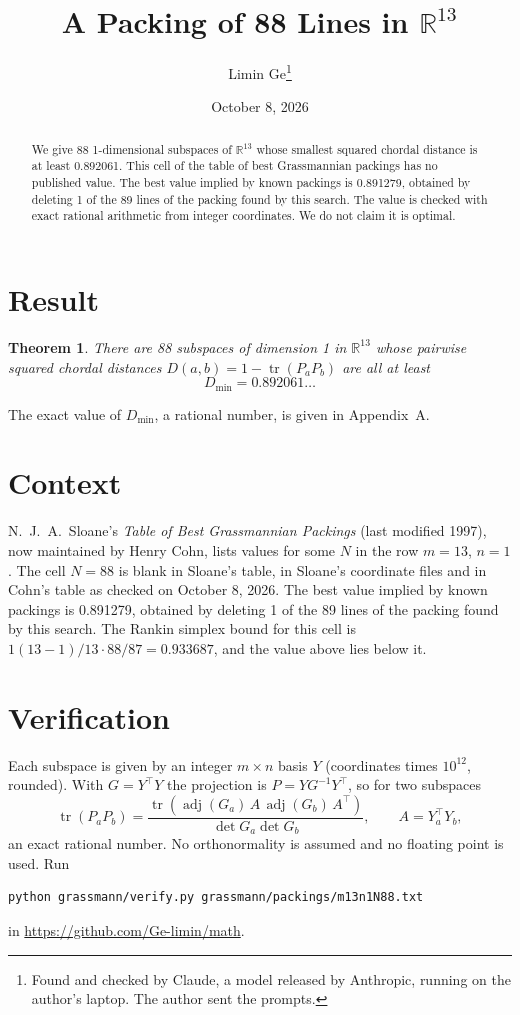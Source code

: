 \documentclass[11pt,a4paper]{article}
\title{A Packing of 88 Lines in $\mathbb{R}^{13}$}
\author{Limin Ge\thanks{Found and checked by Claude, a model released by Anthropic, running on the author's laptop. The author sent the prompts.}}
\date{October 8, 2026}
\newtheorem*{theorem}{Theorem}
\begin{document}
\maketitle
\begin{abstract}
We give 88 1-dimensional subspaces of $\mathbb{R}^{13}$ whose smallest squared chordal distance is at least 0.892061. This cell of the table of best Grassmannian packings has no published value. The best value implied by known packings is 0.891279, obtained by deleting 1 of the 89 lines of the packing found by this search. The value is checked with exact rational arithmetic from integer coordinates. We do not claim it is optimal.
\end{abstract}

\section{Result}
\begin{theorem}
There are 88 subspaces of dimension 1 in $\mathbb{R}^{13}$ whose pairwise squared chordal distances $D(a,b) = 1 - \operatorname{tr}(P_aP_b)$ are all at least
\[ D_{\min} = 0.892061\ldots \]
\end{theorem}
The exact value of $D_{\min}$, a rational number, is given in Appendix~A.


\section{Context}
N.~J.~A.~Sloane's \emph{Table of Best Grassmannian Packings} (last modified 1997), now maintained by Henry Cohn, lists values for some $N$ in the row $m=13$, $n=1$. The cell $N=88$ is blank in Sloane's table, in Sloane's coordinate files and in Cohn's table as checked on October 8, 2026. The best value implied by known packings is 0.891279, obtained by deleting 1 of the 89 lines of the packing found by this search. The Rankin simplex bound for this cell is $1(13-1)/13\cdot 88/87 = 0.933687$, and the value above lies below it.


\section{Verification}
Each subspace is given by an integer $m\times n$ basis $Y$ (coordinates times $10^{12}$, rounded). With $G=Y^\top Y$ the projection is $P=YG^{-1}Y^\top$, so for two subspaces
\[ \operatorname{tr}(P_aP_b)=\frac{\operatorname{tr}(\operatorname{adj}(G_a)\,A\,\operatorname{adj}(G_b)\,A^\top)}{\det G_a\det G_b},\qquad A=Y_a^\top Y_b, \]
an exact rational number. No orthonormality is assumed and no floating point is used. Run
\begin{verbatim}
python grassmann/verify.py grassmann/packings/m13n1N88.txt
\end{verbatim}
in \url{https://github.com/Ge-limin/math}.
\end{document}
